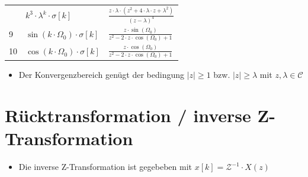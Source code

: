 \documentclass[11pt]{article}
\providecommand{\tightlist}{%
      \setlength{\itemsep}{0pt}\setlength{\parskip}{0pt}}
\begin{document}
\begin{longtable}[]{@{}lll@{}}
\begin{minipage}[t]{0.05\columnwidth}
\end{minipage} & \begin{minipage}[t]{0.28\columnwidth}\raggedright\strut
\(k^3\cdot\lambda^k\cdot\sigma[k]\)\strut
\end{minipage} & \begin{minipage}[t]{0.58\columnwidth}\raggedright\strut
\(\frac{z\cdot\lambda\cdot(z^2+4\cdot\lambda\cdot z+ \lambda^2)}{(z-\lambda)^4}\)\strut
\end{minipage}\tabularnewline
\begin{minipage}[t]{0.05\columnwidth}\raggedright\strut
9\strut
\end{minipage} & \begin{minipage}[t]{0.28\columnwidth}\raggedright\strut
\(\sin (k\cdot\Omega_0)\cdot\sigma[k]\)\strut
\end{minipage} & \begin{minipage}[t]{0.58\columnwidth}\raggedright\strut
\(\frac{z\cdot\sin(\Omega_0)}{z^2-2\cdot z\cdot\cos(\Omega_0)+1}\)\strut
\end{minipage}\tabularnewline
\begin{minipage}[t]{0.05\columnwidth}\raggedright\strut
10\strut
\end{minipage} & \begin{minipage}[t]{0.28\columnwidth}\raggedright\strut
\(\cos (k\cdot\Omega_0)\cdot\sigma[k]\)\strut
\end{minipage} & \begin{minipage}[t]{0.58\columnwidth}\raggedright\strut
\(\frac{z\cdot\cos(\Omega_0)}{z^2-2\cdot z\cdot\cos(\Omega_0)+1}\)\strut
\end{minipage}\tabularnewline
\bottomrule
\end{longtable}

    \begin{itemize}
\tightlist
\item
  Der Konvergenzbereich genügt der bedingung \(|z| \geq 1\) bzw.
  \(|z| \geq \lambda\) mit \(z, \lambda\in \mathcal{C}\)
\end{itemize}

    \section{Rücktransformation / inverse
Z-Transformation}\label{ruxfccktransformation-inverse-z-transformation}

\begin{itemize}
\tightlist
\item
  Die inverse Z-Transformation ist gegebeben mit
  \(x[k] = \mathcal{Z}^{-1} \cdot X(z)\)
\end{itemize}
\end{document}
